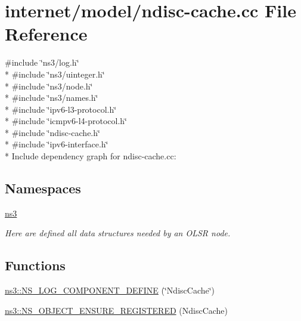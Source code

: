 \hypertarget{ndisc-cache_8cc}{}\section{internet/model/ndisc-\/cache.cc File Reference}
\label{ndisc-cache_8cc}
{\ttfamily \#include \char`\"{}ns3/log.\+h\char`\"{}}\\*
{\ttfamily \#include \char`\"{}ns3/uinteger.\+h\char`\"{}}\\*
{\ttfamily \#include \char`\"{}ns3/node.\+h\char`\"{}}\\*
{\ttfamily \#include \char`\"{}ns3/names.\+h\char`\"{}}\\*
{\ttfamily \#include \char`\"{}ipv6-\/l3-\/protocol.\+h\char`\"{}}\\*
{\ttfamily \#include \char`\"{}icmpv6-\/l4-\/protocol.\+h\char`\"{}}\\*
{\ttfamily \#include \char`\"{}ndisc-\/cache.\+h\char`\"{}}\\*
{\ttfamily \#include \char`\"{}ipv6-\/interface.\+h\char`\"{}}\\*
Include dependency graph for ndisc-\/cache.cc\+:
\subsection*{Namespaces}
\begin{DoxyCompactItemize}
\item 
 \hyperlink{namespacens3}{ns3}
\begin{DoxyCompactList}\small\item\em Here are defined all data structures needed by an O\+L\+SR node. \end{DoxyCompactList}\end{DoxyCompactItemize}
\subsection*{Functions}
\begin{DoxyCompactItemize}
\item 
\hyperlink{namespacens3_a087c3b70946a23daa95cfc41269ddd2b}{ns3\+::\+N\+S\+\_\+\+L\+O\+G\+\_\+\+C\+O\+M\+P\+O\+N\+E\+N\+T\+\_\+\+D\+E\+F\+I\+NE} (\char`\"{}Ndisc\+Cache\char`\"{})
\item 
\hyperlink{namespacens3_a5f1902872d50a07a61588e641183976d}{ns3\+::\+N\+S\+\_\+\+O\+B\+J\+E\+C\+T\+\_\+\+E\+N\+S\+U\+R\+E\+\_\+\+R\+E\+G\+I\+S\+T\+E\+R\+ED} (Ndisc\+Cache)
\end{DoxyCompactItemize}
